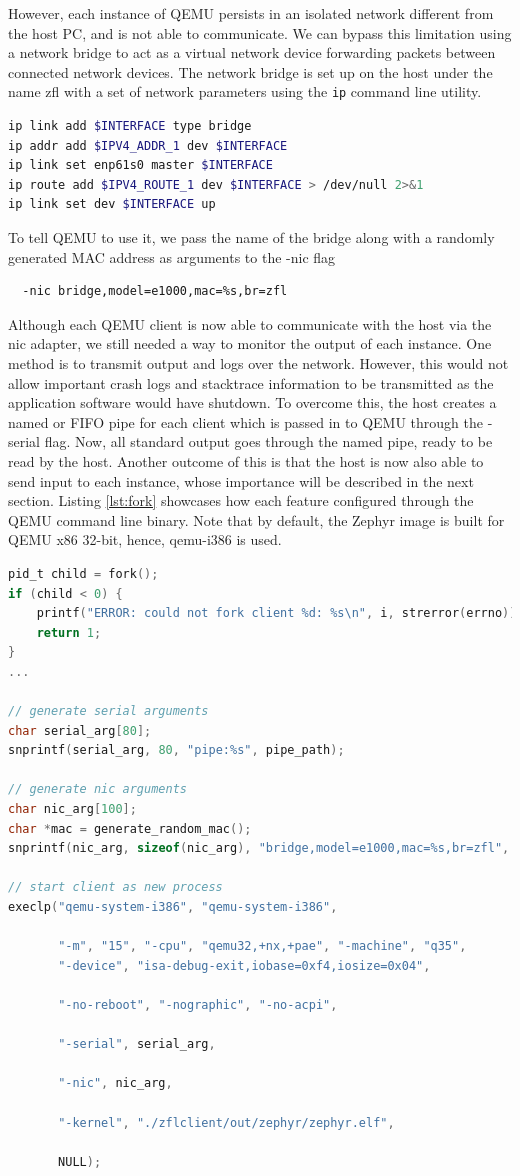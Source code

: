 \documentclass[12pt]{article}
\begin{document}
However, each instance of QEMU persists in an isolated network different from the host PC,
and is not able to communicate. We can bypass this limitation using a network bridge to act as a
virtual network device forwarding packets between connected network devices.
The network bridge is set up on the host under the name zfl with a set of network parameters using
the \verb|ip| command line utility.
\begin{lstlisting}[language=bash,caption=Network bridge setup]
ip link add $INTERFACE type bridge
ip addr add $IPV4_ADDR_1 dev $INTERFACE
ip link set enp61s0 master $INTERFACE
ip route add $IPV4_ROUTE_1 dev $INTERFACE > /dev/null 2>&1
ip link set dev $INTERFACE up
\end{lstlisting}
To tell QEMU to use it, we pass the name of the bridge along
with a randomly generated MAC address as arguments to the -nic flag
\begin{verbatim}
  -nic bridge,model=e1000,mac=%s,br=zfl
\end{verbatim}

Although each QEMU client is now able to communicate with the host via the nic adapter, we still
needed a way to monitor the output of each instance. One method is to transmit
output and logs over the network. However, this would not allow important crash logs and stacktrace
information to be transmitted as the application software would have shutdown. To overcome this, the host
creates a named or FIFO pipe for each client which is passed in to
QEMU through the -serial flag. Now, all standard output goes through the named pipe, ready to be read
by the host. Another outcome of this is that the host is now also able to send input to each
instance, whose importance will be described in the next section. Listing \ref{lst:fork} showcases
how each feature configured through the QEMU command line binary. Note that by default, the Zephyr
image is built for QEMU x86 32-bit, hence, qemu-i386 is used.

\begin{lstlisting}[language=C,caption=Client forking process,label={lst:fork}]
pid_t child = fork();
if (child < 0) {
    printf("ERROR: could not fork client %d: %s\n", i, strerror(errno));
    return 1;
}
...

// generate serial arguments
char serial_arg[80];
snprintf(serial_arg, 80, "pipe:%s", pipe_path);

// generate nic arguments
char nic_arg[100];
char *mac = generate_random_mac();
snprintf(nic_arg, sizeof(nic_arg), "bridge,model=e1000,mac=%s,br=zfl", mac);

// start client as new process
execlp("qemu-system-i386", "qemu-system-i386",

       "-m", "15", "-cpu", "qemu32,+nx,+pae", "-machine", "q35",
       "-device", "isa-debug-exit,iobase=0xf4,iosize=0x04",

       "-no-reboot", "-nographic", "-no-acpi",

       "-serial", serial_arg,

       "-nic", nic_arg,

       "-kernel", "./zflclient/out/zephyr/zephyr.elf",

       NULL);
\end{lstlisting}
\end{document}
